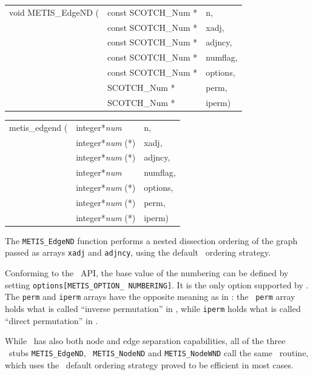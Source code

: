 \begin{itemize}
\progsyn

{\tt\begin{tabular}{l@{}ll}
void METIS\_EdgeND ( & const SCOTCH\_Num * & n,       \\
                     & const SCOTCH\_Num * & xadj,    \\
                     & const SCOTCH\_Num * & adjncy,  \\
                     & const SCOTCH\_Num * & numflag, \\
                     & const SCOTCH\_Num * & options, \\
                     & SCOTCH\_Num *       & perm,    \\
                     & SCOTCH\_Num *       & iperm)
\end{tabular}}

{\tt\begin{tabular}{l@{}ll}
metis\_edgend ( & integer*{\it num}     & n,       \\
                & integer*{\it num} (*) & xadj,    \\
                & integer*{\it num} (*) & adjncy,  \\
                & integer*{\it num}     & numflag, \\
                & integer*{\it num} (*) & options, \\
                & integer*{\it num} (*) & perm,    \\
                & integer*{\it num} (*) & iperm)
\end{tabular}}

\progdes

The {\tt METIS\_EdgeND} function performs a nested dissection ordering
of the graph passed as arrays {\tt xadj} and {\tt adjncy}, using
the default \scotch\ ordering strategy.

Conforming to the \metis\ API, the base value of the numbering
can be defined by setting \texttt{options[METIS\_\lbt OPTION\_\lbt
NUMBERING]}. It is the only option supported by \scotch.
The {\tt perm} and {\tt iperm} arrays have the opposite meaning
as in \scotch: the \metis\ {\tt perm} array holds what is called
``inverse permutation'' in \scotch, while {\tt iperm} holds what is
called ``direct permutation'' in \scotch.

While \scotch\ has also both node and edge separation capabilities,
all of the three \metis\ stubs {\tt METIS\_\lbo EdgeND}, {\tt
METIS\_\lbo NodeND} and {\tt METIS\_\lbo NodeWND} call the same
\scotch\ routine, which uses the \scotch\ default ordering strategy
proved to be efficient in most cases.
\end{itemize}

